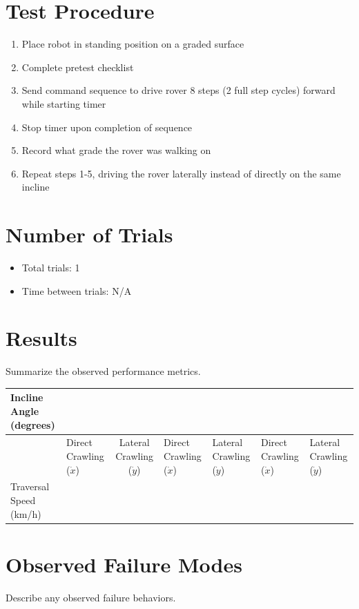 \documentclass[11pt]{article}
\begin{document}
\section*{Test Procedure}
\begin{enumerate}[noitemsep]
    \item Place robot in standing position on a graded surface
    \item Complete pretest checklist
    \item     Send command sequence to drive rover 8 steps (2 full step cycles) forward while starting timer
    \item Stop timer upon completion of sequence
    \item Record what grade the rover was walking on
    \item Repeat steps 1-5, driving the rover laterally instead of directly on the same incline

\end{enumerate}

\section*{Number of Trials}
\begin{itemize}[noitemsep]
    \item Total trials: 1
    \item Time between trials: N/A
\end{itemize}

\section*{Results}
Summarize the observed performance metrics.

\begin{center}
\begin{tabular}{llcllll}\toprule
 Incline Angle (degrees)& \multicolumn{2}{c}{} & \multicolumn{2}{c}{}& \multicolumn{2}{c}{}\\\midrule
 & Direct Crawling ($\dot x$)&Lateral Crawling ($\dot y$) & Direct Crawling ($\dot x$)& Lateral Crawling ($\dot y$)& Direct Crawling ($\dot x$)&Lateral Crawling ($\dot y$)\\

Traversal Speed (km/h)&   & & & & &\\ \bottomrule
\end{tabular}
\end{center}

\section*{Observed Failure Modes}
Describe any observed failure behaviors.
\end{document}
